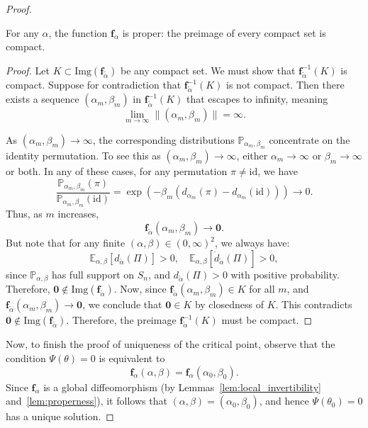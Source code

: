 \documentclass[10pt,a4paper]{amsart}
\renewcommand{\P}{\mathbb{P}}
\begin{document}
\begin{proof}
\bigskip

\begin{lemma}[Properness]\label{lem:properness}
For any \(\alpha\), the function \(\boldsymbol{f}_{\alpha}\) is proper: the preimage of every compact set is compact.
\end{lemma}

\begin{proof}
Let \(K\subset \mathrm{Img}(\boldsymbol{f}_{\tilde\alpha})\) be any compact set.  
We must show that \(\boldsymbol{f}_{\tilde\alpha}^{-1}(K)\) is compact.
Suppose for contradiction that \(\boldsymbol{f}_{\tilde\alpha}^{-1}(K)\) is not compact.  
Then there exists a sequence \((\alpha_m,\beta_m)\) in \(\boldsymbol{f}_{\tilde\alpha}^{-1}(K)\) that escapes to infinity, meaning
\[
\lim_{m\to\infty} \|(\alpha_m,\beta_m)\| = \infty.
\]

As \((\alpha_m,\beta_m)\to\infty\), the corresponding distributions \(\P_{\alpha_m,\beta_m}\) concentrate on the identity permutation. To see this as \((\alpha_m,\beta_m) \to \infty\), either \(\alpha_m \to \infty\) or \(\beta_m \to \infty\) or both. In any of these cases, for any permutation \(\pi \neq \mathrm{id}\), we have
\[
\frac{\P_{\alpha_m,\beta_m}(\pi)}{\P_{\alpha_m,\beta_m}(\mathrm{id})} = \exp\left( -\beta_m ( d_{\alpha_m}(\pi) - d_{\alpha_m}(\mathrm{id}) ) \right) \to 0.
\] Thus, as $m$ increases,
\[
\boldsymbol{f}_{\tilde\alpha}(\alpha_m, \beta_m) \to \boldsymbol{0}.
\]
But note that for any finite \((\alpha,\beta) \in (0,\infty)^2\), we always have:
\[
\mathbb{E}_{\alpha,\beta}[d_{\tilde\alpha}(\Pi)] > 0,
\quad
\mathbb{E}_{\alpha,\beta}[\dot{d}_{\tilde\alpha}(\Pi)] > 0,
\]
since \(\P_{\alpha,\beta}\) has full support on \(S_n\), and \(d_{\tilde\alpha}(\Pi) > 0\) with positive probability.
Therefore, \(\boldsymbol{0} \notin \mathrm{Img}(\boldsymbol{f}_{\tilde\alpha})\).
Now, since \(\boldsymbol{f}_{\tilde\alpha}(\alpha_m, \beta_m) \in K\) for all \(m\), and \(\boldsymbol{f}_{\tilde\alpha}(\alpha_m, \beta_m) \to \boldsymbol{0}\), we conclude that \(\boldsymbol{0} \in K\) by closedness of \(K\).
This contradicts \(\boldsymbol{0} \notin \mathrm{Img}(\boldsymbol{f}_{\tilde\alpha})\). Therefore, the preimage \(\boldsymbol{f}_{\tilde\alpha}^{-1}(K)\) must be compact.

\end{proof}

Now, to finish the proof of uniqueness of the critical point, observe that the condition \(\Psi(\theta) = 0\) is equivalent to
\[
\boldsymbol{f}_\alpha(\alpha,\beta) = \boldsymbol{f}_\alpha(\alpha_0,\beta_0).
\]
Since \(\boldsymbol{f}_\alpha\) is a global diffeomorphism (by Lemmas~\ref{lem:local_invertibility} and~\ref{lem:properness}), it follows that \((\alpha,\beta) = (\alpha_0,\beta_0)\), and hence \(\Psi(\theta_0) = 0\) has a unique solution.


\end{proof}
\end{document}
